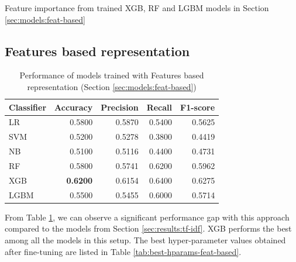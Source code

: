 \begin{landscape}
\begin{table}[!h]
    {Feature importance from trained \ac{XGB}, \ac{RF} and \ac{LGBM} models in Section \ref{sec:models:feat-based}}
    \label{tab:best-hparams-tf-based-tfidf-vect}
\end{table}

\vfill
\clearpage
\end{landscape}


\subsection{Features based representation}
\label{sec:results:feat-extr}

\begin{table}[htbp]
\centering
\begin{tabular}{lrrrr}
\hline
\textbf{Classifier} & \multicolumn{1}{l}{\textbf{Accuracy}} & \multicolumn{1}{l}{\textbf{Precision}} & \multicolumn{1}{l}{\textbf{Recall}} & \multicolumn{1}{l}{\textbf{F1-score}} \\ \hline
LR & 0.5800 & 0.5870 & 0.5400 & 0.5625 \\
SVM & 0.5200 & 0.5278 & 0.3800 & 0.4419 \\
NB & 0.5100 & 0.5116 & 0.4400 & 0.4731 \\
RF & 0.5800 & 0.5741 & 0.6200 & 0.5962 \\
XGB & \textbf{0.6200} & 0.6154 & 0.6400 & {0.6275} \\
LGBM & 0.5500 & 0.5455 & 0.6000 & 0.5714 \\ \hline
\end{tabular}
\caption{Performance of models trained with Features based representation (Section \ref{sec:models:feat-based})}
\label{tab:results:performance-feat-based}
\end{table}

From Table \ref{tab:results:performance-feat-based}, we can observe a significant performance gap with this approach compared to the models from Section \ref{sec:results:tf-idf}. \ac{XGB} performs the best among all the models in this setup. The best hyper-parameter values obtained after fine-tuning are listed in Table \ref{tab:best-hparams-feat-based}.


